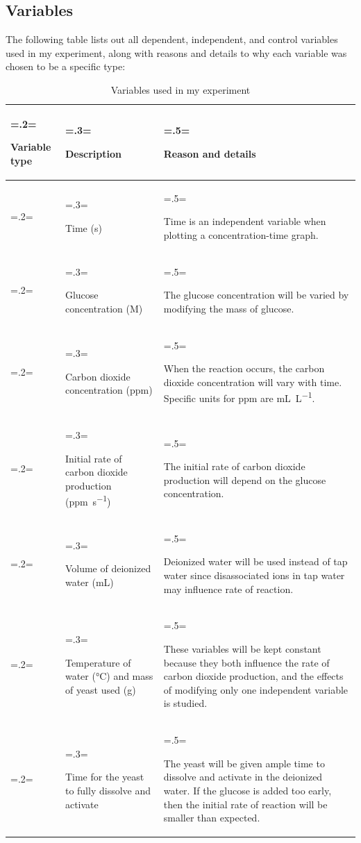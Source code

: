 \documentclass{article}
\begin{document}
\subsection{Variables}
The following table lists out all dependent, independent, and control variables used in my experiment, along with reasons and details to why each variable was chosen to be a specific type:
\begin{table}[H]
\centering
\caption{Variables used in my experiment}
\label{table:2}
\begin{tabularx}{\textwidth} {
    | >{\hsize=.2\hsize \linewidth=\hsize \raggedright\arraybackslash}X
    | >{\hsize=.3\hsize \linewidth=\hsize \raggedright\arraybackslash}X
    | >{\hsize=.5\hsize \linewidth=\hsize \raggedright\arraybackslash}X |}
    \hline
    \rowcolor[HTML]{CCCCCC} Variable type & Description & Reason and details \\
    \hline
    \multirow[t]{2}{\hsize}{Independent} & Time (\si{s}) & Time is an independent variable when plotting a concentration-time graph. \\
    \cline{2-3}
    & Glucose concentration (\si{M}) & The glucose concentration will be varied by modifying the mass of glucose. \\
    \hline
    \multirow[t]{2}{\hsize}{Dependent} & Carbon dioxide concentration (\si{ppm}) & When the reaction occurs, the carbon dioxide concentration will vary with time. Specific units for ppm are \si{mL.L^{-1}}. \\
    \cline{2-3}
    & Initial rate of carbon dioxide production (\si{ppm.s^{-1}}) & The initial rate of carbon dioxide production will depend on the glucose concentration. \\
    \hline
    \multirow[t]{3}{\hsize}{Control} & Volume of deionized water (\si{mL}) & Deionized water will be used instead of tap water since disassociated ions in tap water may influence rate of reaction. \\
    \cline{2-3}
    & Temperature of water (\si{\celsius}) and mass of yeast used (\si{g}) & These variables will be kept constant because they both influence the rate of carbon dioxide production, and the effects of modifying only one independent variable is studied. \\
    \cline{2-3}
    & Time for the yeast to fully dissolve and activate & The yeast will be given ample time to dissolve and activate in the deionized water. If the glucose is added too early, then the initial rate of reaction will be smaller than expected. \\
    \hline
\end{tabularx}
\end{table}
\end{document}
